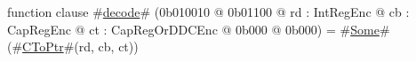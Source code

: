 function clause #\hyperref[zdecode]{decode}# (0b010010 @ 0b01100 @ rd : IntRegEnc @ cb : CapRegEnc @ ct : CapRegOrDDCEnc @ 0b000 @ 0b000) = #\hyperref[zSome]{Some}#(#\hyperref[zCToPtr]{CToPtr}#(rd, cb, ct))
